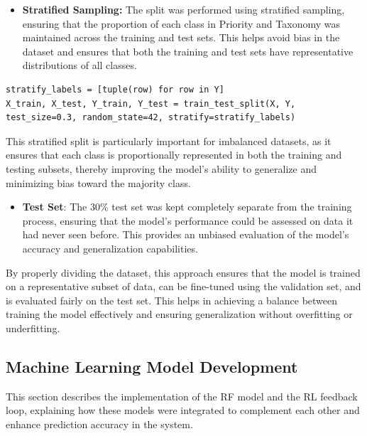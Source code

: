 \begin{itemize}
    \item \textbf{Stratified Sampling:} The split was performed using stratified sampling, ensuring that the proportion of each class in Priority and Taxonomy was maintained across the training and test sets. This helps avoid bias in the dataset and ensures that both the training and test sets have representative distributions of all classes.
\end{itemize}

\vspace{0.2cm}
\noindent
\begin{minipage}{\linewidth}
\begin{verbatim}
stratify_labels = [tuple(row) for row in Y]
X_train, X_test, Y_train, Y_test = train_test_split(X, Y, test_size=0.3, random_state=42, stratify=stratify_labels)
\end{verbatim}
\label{lst:stratified_sampling}
\end{minipage}
\vspace{0.1cm}

This stratified split is particularly important for imbalanced datasets, as it ensures that each class is proportionally represented in both the training and testing subsets, thereby improving the model's ability to generalize and minimizing bias toward the majority class.

\begin{itemize}
    \item \textbf{Test Set}: The 30\% test set was kept completely separate from the training process, ensuring that the model's performance could be assessed on data it had never seen before. This provides an unbiased evaluation of the model's accuracy and generalization capabilities.
\end{itemize}

By properly dividing the dataset, this approach ensures that the model is trained on a representative subset of data, can be fine-tuned using the validation set, and is evaluated fairly on the test set. 
This helps in achieving a balance between training the model effectively and ensuring generalization without overfitting or underfitting.

\subsection{Machine Learning Model Development}
This section describes the implementation of the RF model and the RL feedback loop, explaining how these models were integrated to complement each other and enhance prediction accuracy in the system.

